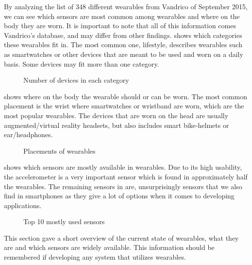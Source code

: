 By analyzing the list of 348 different wearables from Vandrico\cite{LISTOFWEARABLES} of September 2015, we can see which sensors are most common among wearables and where on the body they are worn. It is important to note that all of this information comes Vandrico's database, and may differ from other findings.  shows which categories these wearables fit in. The most common one, lifestyle, describes wearables such as smartwatches or other devices that are meant to be used and worn on a daily basis. Some devices may fit more than one category.

\begin{figure}[!htb]
    \centering
    
    \caption{Number of devices in each category}
    \label{fig:wearables-category}
\end{figure}

 shows where on the body the wearable should or can be worn. The most common placement is the wrist where smartwatches or wristband are worn, which are the most popular wearables. The devices that are worn on the head are usually augmented/virtual reality headsets, but also includes smart bike-helmets or ear/headphones.

\begin{figure}[!htb]
  \centering
  
  \caption{Placements of wearables}
  \label{fig:wearables-placement}
\end{figure}

 shows which sensors are mostly available in wearables. Due to its high usability, the accelerometer is a very important sensor which is found in approximately half the wearables. The remaining sensors in  are, unsurprisingly sensors that we also find in smartphones as they give a lot of options when it comes to developing applications. 
\begin{figure}[!htb]
    \centering
    
    \caption{Top 10 mostly used sensors }
    \label{fig:wearables-sensors}
\end{figure}

This section gave a short overview of the current state of wearables, what they are and which sensors are widely available. This information should be remembered if developing any system that utilizes wearables. 


